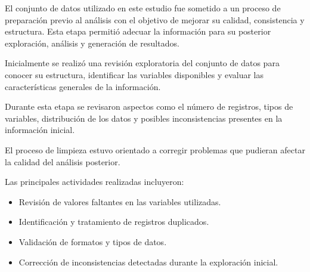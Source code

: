 

El conjunto de datos utilizado en este estudio fue sometido a un proceso de preparación previo al análisis con el objetivo de mejorar su calidad, consistencia y estructura. Esta etapa permitió adecuar la información para su posterior exploración, análisis y generación de resultados.





Inicialmente se realizó una revisión exploratoria del conjunto de datos para conocer su estructura, identificar las variables disponibles y evaluar las características generales de la información.

Durante esta etapa se revisaron aspectos como el número de registros, tipos de variables, distribución de los datos y posibles inconsistencias presentes en la información inicial.





El proceso de limpieza estuvo orientado a corregir problemas que pudieran afectar la calidad del análisis posterior.

Las principales actividades realizadas incluyeron:

\begin{itemize}

\item Revisión de valores faltantes en las variables utilizadas.

\item Identificación y tratamiento de registros duplicados.

\item Validación de formatos y tipos de datos.

\item Corrección de inconsistencias detectadas durante la exploración inicial.

\end{itemize}



